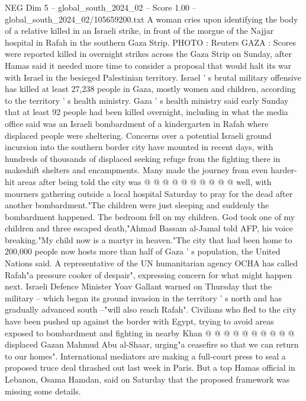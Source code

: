\begin{textsample}{NEG Dim 5 – global\_south\_2024\_02 – Score 1.00 – global\_south\_2024\_02/105659200.txt}  \label{ex:f5_neg_306}
A woman cries upon identifying the body of a relative killed in an Israeli strike, in front of the morgue of the Najjar hospital in Rafah in the southern Gaza Strip.
PHOTO : Reuters GAZA : Scores were reported killed in overnight strikes across the Gaza Strip on Sunday, after Hamas said it needed more time to consider a proposal that would halt its war with Israel in the besieged Palestinian territory.
Israel ' s brutal military offensive has killed at least 27,238 people in Gaza, mostly women and children, according to the territory ' s health ministry.
Gaza ' s health ministry said early Sunday that at least 92 people had been killed overnight, including in what the media office said was an Israeli bombardment of a kindergarten in Rafah where displaced people were sheltering.
Concerns over a potential Israeli ground incursion into the southern border city have mounted in recent days, with hundreds of thousands of displaced seeking refuge from the fighting there in makeshift shelters and encampments.
Many made the journey from even harder-hit areas after being told the city was @ @ @ @ @ @ @ @ @ @ well, with mourners gathering outside a local hospital Saturday to pray for the dead after another bombardment."The children were just sleeping and suddenly the bombardment happened.
The bedroom fell on my children.
God took one of my children and three escaped death,"Ahmad Bassam al-Jamal told AFP, his voice breaking."My child now is a martyr in heaven."The city that had been home to 200,000 people now hosts more than half of Gaza ' s population, the United Nations said.
A representative of the UN humanitarian agency OCHA has called Rafah"a pressure cooker of despair", expressing concern for what might happen next.
Israeli Defence Minister Yoav Gallant warned on Thursday that the military -- which began its ground invasion in the territory ' s north and has gradually advanced south --"will also reach Rafah".
Civilians who fled to the city have been pushed up against the border with Egypt, trying to avoid areas exposed to bombardment and fighting in nearby Khan @ @ @ @ @ @ @ @ @ @ displaced Gazan Mahmud Abu al-Shaar, urging"a ceasefire so that we can return to our homes".
International mediators are making a full-court press to seal a proposed truce deal thrashed out last week in Paris.
But a top Hamas official in Lebanon, Osama Hamdan, said on Saturday that the proposed framework was missing some details.

\end{textsample}
